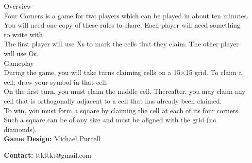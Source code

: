 \begin{minipage}{6cm}\raggedright
{\setmainfont[Scale=0.95]{Century Gothic-Bold}\LARGE Overview}\\[1.0ex]

\setmainfont{Tex Gyre Schola}
Four Corners is a game for two players which can be played in about ten minutes.\\[1.125ex]

You will need one copy of these rules to share. Each player will need something to write with.\\[1.125ex]

The first player will use {\setmainfont[Scale=0.95]{Century Gothic-Bold} X}s to mark the cells that they claim. The other player will use {\setmainfont[Scale=0.95]{Century Gothic-Bold} O}s.\\[2ex]

{\setmainfont[Scale=0.95]{Century Gothic-Bold}\LARGE Gameplay}\\[1.0ex]

During the game, you will take turns claiming cells on a 15$\times$15 grid. To claim a cell, draw your symbol in that cell.\\[1.125ex]

On the first turn, you must claim the middle cell. Thereafter, you may claim any cell that is orthogonally adjacent to a cell that has already been claimed.\\[1.125ex]

To win, you must form a square by claiming the cell at each of its four corners. Such a square can be of any size and must be aligned with the grid (no diamonds).\\[1.125ex]

\textbf{Game Design:} Michael Purcell

\textbf{Contact:} ttkttkt@gmail.com
\end{minipage}
